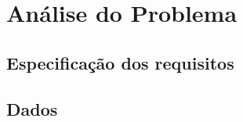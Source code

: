 \chapter{Análise do Problema}
\label{cap:analise}

\section{Especificação dos requisitos}
\label{sec:especificacao:analise}



\section{Dados}
\label{sec:dados:analise}



